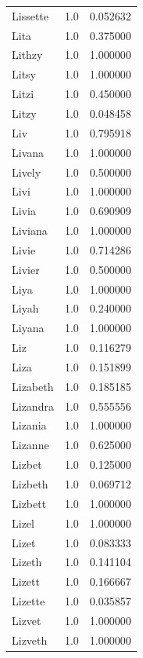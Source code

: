 \documentclass[
  letterpaper,
  DIV=11,
  numbers=noendperiod]{scrreprt}
\begin{document}
\begin{tabular}{lrr}
Lissette        &   1.0 &   0.052632 \\
Lita            &   1.0 &   0.375000 \\
Lithzy          &   1.0 &   1.000000 \\
Litsy           &   1.0 &   1.000000 \\
Litzi           &   1.0 &   0.450000 \\
Litzy           &   1.0 &   0.048458 \\
Liv             &   1.0 &   0.795918 \\
Livana          &   1.0 &   1.000000 \\
Lively          &   1.0 &   0.500000 \\
Livi            &   1.0 &   1.000000 \\
Livia           &   1.0 &   0.690909 \\
Liviana         &   1.0 &   1.000000 \\
Livie           &   1.0 &   0.714286 \\
Livier          &   1.0 &   0.500000 \\
Liya            &   1.0 &   1.000000 \\
Liyah           &   1.0 &   0.240000 \\
Liyana          &   1.0 &   1.000000 \\
Liz             &   1.0 &   0.116279 \\
Liza            &   1.0 &   0.151899 \\
Lizabeth        &   1.0 &   0.185185 \\
Lizandra        &   1.0 &   0.555556 \\
Lizania         &   1.0 &   1.000000 \\
Lizanne         &   1.0 &   0.625000 \\
Lizbet          &   1.0 &   0.125000 \\
Lizbeth         &   1.0 &   0.069712 \\
Lizbett         &   1.0 &   1.000000 \\
Lizel           &   1.0 &   1.000000 \\
Lizet           &   1.0 &   0.083333 \\
Lizeth          &   1.0 &   0.141104 \\
Lizett          &   1.0 &   0.166667 \\
Lizette         &   1.0 &   0.035857 \\
Lizvet          &   1.0 &   1.000000 \\
Lizveth         &   1.0 &   1.000000 \\

\end{tabular}
\end{document}
